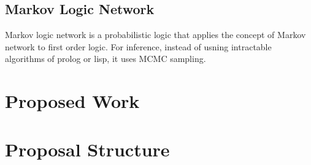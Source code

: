 %

\subsection{Markov Logic Network}
Markov logic network is a probabilistic logic that applies the concept of Markov network to first order logic. For inference, instead of usning intractable algorithms of prolog or lisp, it uses MCMC sampling.

\section{Proposed Work}

\section{Proposal Structure}

 
 
 

